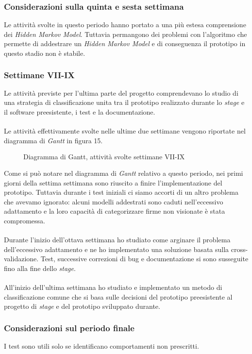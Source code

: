 \subsubsection*{Considerazioni sulla quinta e sesta settimana}
\label{3.1.3.1}
Le attività svolte in questo periodo hanno portato a una più estesa comprensione dei \emph{Hidden Markov Model}. Tuttavia permangono dei problemi con l'algoritmo che permette di addestrare un \emph{Hidden Markov Model} e di conseguenza il prototipo in questo stadio non è stabile.
\subsubsection{Settimane VII-IX}
\label{3.1.4}
Le attività previste per l'ultima parte del progetto comprendevano lo studio di una strategia di classificazione unita tra il prototipo realizzato durante lo \emph{stage} e il software preesistente, i test e la documentazione.\\\\
Le attività effettivamente svolte nelle ultime due settimane vengono riportate nel diagramma di \emph{Gantt} in figura 15.
\begin{figure}[H]
\centering
\noindent{}
\caption{Diagramma di Gantt, attività svolte settimane VII-IX}
\end{figure}
Come si può notare nel diagramma di \emph{Gantt} relativo a questo periodo, nei primi giorni della settima settimana sono riuscito a finire l'implementazione del prototipo. Tuttavia durante i test iniziali ci siamo accorti di un altro problema che avevamo ignorato: alcuni modelli addestrati sono caduti nell'eccessivo adattamento e la loro capacità di categorizzare firme non visionate è stata compromessa.\\\\
Durante l'inizio dell'ottava settimana ho studiato come arginare il problema dell'eccessivo adattamento e ne ho implementato una soluzione basata sulla cross-validazione. Test, successive correzioni di bug e documentazione si sono susseguite fino alla fine dello \emph{stage}.\\\\
All'inizio dell'ultima settimana ho studiato e implementato un metodo di classificazione comune che si basa sulle decisioni del prototipo preesistente al progetto di \emph{stage} e del prototipo sviluppato durante.
\subsubsection*{Considerazioni sul periodo finale}
\label{3.1.4.1}
I test sono utili solo se identificano comportamenti non prescritti.
